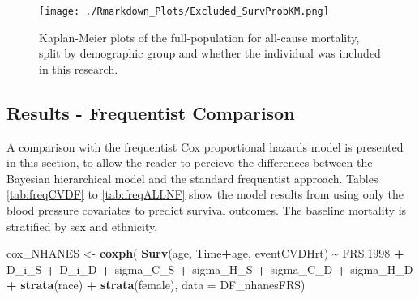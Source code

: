 \documentclass[
]{article}
\newenvironment{Shaded}{\begin{snugshade}}{\end{snugshade}}
\newcommand{\AttributeTok}[1]{\textcolor[rgb]{0.13,0.29,0.53}{#1}}
\newcommand{\FloatTok}[1]{\textcolor[rgb]{0.00,0.00,0.81}{#1}}
\newcommand{\FunctionTok}[1]{\textcolor[rgb]{0.13,0.29,0.53}{\textbf{#1}}}
\newcommand{\NormalTok}[1]{#1}
\newcommand{\OtherTok}[1]{\textcolor[rgb]{0.56,0.35,0.01}{#1}}
\newcommand{\SpecialCharTok}[1]{\textcolor[rgb]{0.81,0.36,0.00}{\textbf{#1}}}
\begin{document}
\begin{figure}
\centering
\texttt{[image: ./Rmarkdown\_Plots/Excluded\_SurvProbKM.png]}
\caption{Kaplan-Meier plots of the full-population for all-cause mortality, split by demographic group and whether the individual was included in this research.}\label{fig:excpop}
\end{figure}

\subsection{Results - Frequentist Comparison}\label{results---frequentist-comparison}

A comparison with the frequentist Cox proportional hazards model is presented in this section, to allow the reader to percieve the differences between the Bayesian hierarchical model and the standard frequentist approach. Tables \ref{tab:freqCVDF} to \ref{tab:freqALLNF} show the model results from using only the blood pressure covariates to predict survival outcomes.
The baseline mortality is stratified by sex and ethnicity.

\begin{Shaded}
\begin{Highlighting}[]
\NormalTok{cox\_NHANES }\OtherTok{\textless{}{-}} \FunctionTok{coxph}\NormalTok{( }\FunctionTok{Surv}\NormalTok{(age, Time}\SpecialCharTok{+}\NormalTok{age, eventCVDHrt) }\SpecialCharTok{\textasciitilde{}}\NormalTok{ FRS}\FloatTok{.1998} \SpecialCharTok{+}
\NormalTok{                     D\_i\_S }\SpecialCharTok{+}\NormalTok{ D\_i\_D }\SpecialCharTok{+}\NormalTok{ sigma\_C\_S }\SpecialCharTok{+}\NormalTok{ sigma\_H\_S }\SpecialCharTok{+}
\NormalTok{                     sigma\_C\_D }\SpecialCharTok{+}\NormalTok{ sigma\_H\_D }\SpecialCharTok{+} \FunctionTok{strata}\NormalTok{(race) }\SpecialCharTok{+} \FunctionTok{strata}\NormalTok{(female), }\AttributeTok{data =}\NormalTok{ DF\_nhanesFRS)}
\end{Highlighting}
\end{Shaded}
\end{document}

